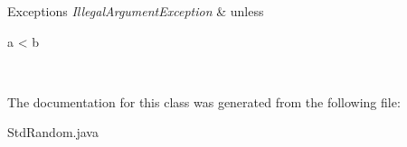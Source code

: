 \begin{DoxyExceptions}{Exceptions}
{\em Illegal\+Argument\+Exception} & unless
\begin{DoxyCode}
a < b 
\end{DoxyCode}
 \\
\hline
\end{DoxyExceptions}


The documentation for this class was generated from the following file\+:\begin{DoxyCompactItemize}
\item 
Std\+Random.\+java\end{DoxyCompactItemize}
